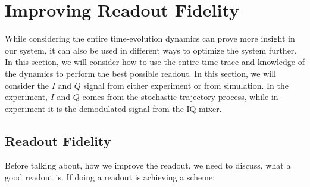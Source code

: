 \chapter{Improving Readout Fidelity}
While considering the entire time-evolution dynamics can prove more insight in our system, it can also be used in different ways to optimize the system further. In this section, we will consider how to use the entire time-trace and knowledge of the dynamics to perform the best possible readout. In this section, we will consider the $I$ and $Q$ signal from either experiment or from simulation. In the experiment, $I$ and $Q$ comes from the stochastic trajectory process, while in experiment it is the demodulated signal from the IQ mixer.

\section{Readout Fidelity}
Before talking about, how we improve the readout, we need to discuss, what a good readout is. If doing a readout is achieving a scheme:

